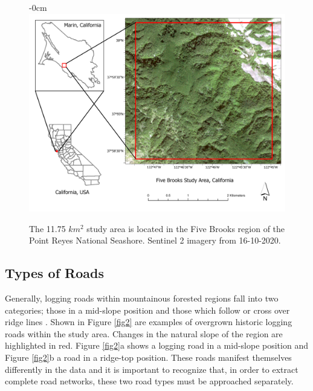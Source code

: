 \documentclass[remotesensing,article,submit,pdftex,moreauthors]{Definitions/mdpi}
\begin{document}
\begin{figure}[H]	
\begin{adjustwidth}{-\extralength}{0cm}
\centering
\includegraphics[width=15 cm]{LayoutBrooks.png}
\end{adjustwidth}
\caption{The 11.75 $km^2$ study area is located in the Five Brooks region of the Point Reyes National Seashore. Sentinel 2 imagery from 16-10-2020.\label{fig1}}
\end{figure}  

\subsection{Types of Roads}
Generally, logging roads within mountainous forested regions fall into two categories; those in a mid-slope position and those which follow or cross over ridge lines \cite{sherba}. Shown in Figure \ref{fig2} are examples of overgrown historic logging roads within the study area. Changes in the natural slope of the region are highlighted in red. Figure \ref{fig2}a shows a logging road in a mid-slope position and Figure \ref{fig2}b a road in a ridge-top position. These roads manifest themselves differently in the data and it is important to recognize that, in order to extract complete road networks, these two road types must be approached separately.
\end{document}
